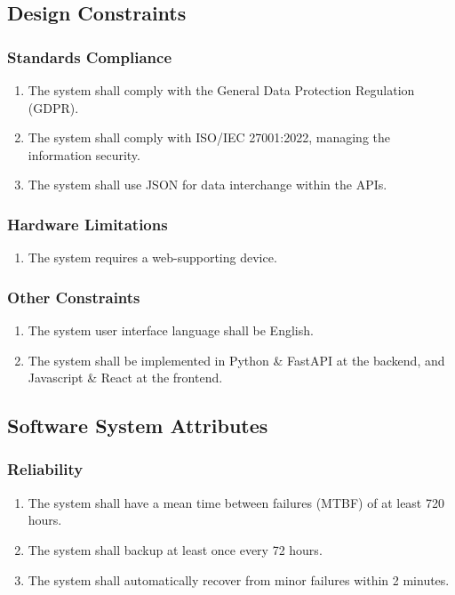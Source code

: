 \subsection{Design Constraints}
\label{sec:des}
\subsubsection{Standards Compliance}
\begin{enumerate}[resume]
    \item The system shall comply with the General Data Protection Regulation (GDPR).
    \item The system shall comply with ISO/IEC 27001:2022, managing the information security.
    \item The system shall use JSON for data interchange within the APIs.
\end{enumerate}
 

\subsubsection{Hardware Limitations}
\begin{enumerate}[resume]
    \item The system requires a web-supporting device.
\end{enumerate}
 

\subsubsection{Other Constraints}
\begin{enumerate}[resume]
    \item The system user interface language shall be English.
    \item The system shall be implemented in Python \& FastAPI at the backend, and Javascript \& React at the frontend.
\end{enumerate}



\subsection{Software System Attributes}
\label{sec:swsa}
\subsubsection{Reliability}
\begin{enumerate}[resume]
    \item The system shall have a mean time between failures (MTBF) of at least 720 hours.
    \item The system shall backup at least once every 72 hours.
    \item The system shall automatically recover from minor failures within 2 minutes.
\end{enumerate}

